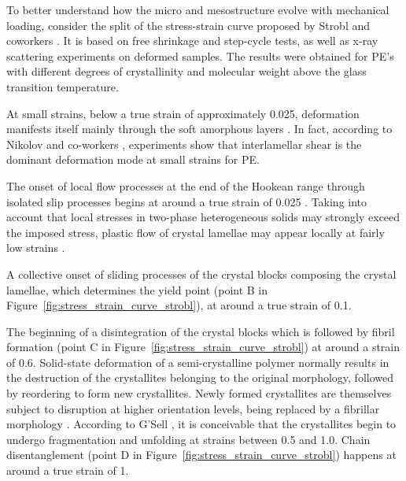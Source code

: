 To better understand how the micro and mesostructure evolve with mechanical loading, consider the split of the stress-strain curve proposed by Strobl and coworkers \citep{hissNetworkStretchingSlip1999, hobeikaTemperatureStrainRate2000, hongModelTreatingTensile2004, hongModelTreatmentTensile2004, naViscousForceDominatedTensileDeformation2006}.
It is based on free shrinkage and step-cycle tests, as well as x-ray scattering experiments on deformed samples.
The results were obtained for PE's with different degrees of crystallinity and molecular weight above the glass transition temperature.

At small strains, below a true strain of approximately \num{0.025}, deformation manifests itself mainly through the soft amorphous layers \citep{patlazhanStructuralMechanicsSemicrystalline2012}.
In fact, according to Nikolov and co-workers  \citep{nikolovMicroMacroConstitutive2000, nikolovMultiscaleConstitutiveModeling2002}, experiments show that interlamellar shear is the dominant deformation mode at small strains for PE.

The onset of local flow processes at the end of the Hookean range through isolated slip processes begins at around a true strain of \num{0.025} \citep{hissNetworkStretchingSlip1999}.
Taking into account that local stresses in two-phase heterogeneous solids may strongly exceed the imposed stress, plastic flow of crystal lamellae may appear locally at fairly low strains \citep{patlazhanStructuralMechanicsSemicrystalline2012}.

A collective onset of sliding processes of the crystal blocks composing the crystal lamellae, which determines the yield point (point B in Figure~\ref{fig:stress_strain_curve_strobl}), at around a true strain of 0.1.

The beginning of a disintegration of the crystal blocks which is followed by fibril formation (point C in Figure~\ref{fig:stress_strain_curve_strobl}) at around a strain of 0.6.
Solid-state deformation of a semi-crystalline polymer normally results in the destruction of the crystallites belonging to the original morphology, followed by reordering to form new crystallites.
Newly formed crystallites are themselves subject to disruption at higher orientation levels, being replaced by a fibrillar morphology  \citep{peacockHandbookPolyethyleneStructures2014}.
According to G'Sell \citep{gsellEvolutionMicrostructureSemicrystalline1994}, it is conceivable that the crystallites begin to undergo fragmentation and unfolding at strains between 0.5 and 1.0.
Chain disentanglement (point D in Figure~\ref{fig:stress_strain_curve_strobl}) happens at around a true strain of 1.

